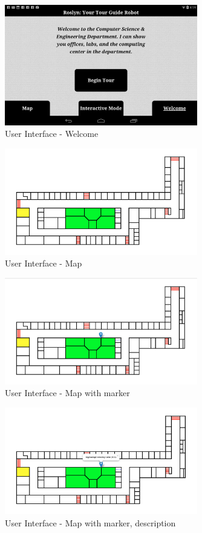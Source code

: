 \documentclass[11pt]{report}
\begin{document}
\begin{figure}[H]
 \centering
 \includegraphics[width=0.75\textwidth]{ui1.png}
 \caption{User Interface - Welcome}
 \label{fig:ui1}
\end{figure}
\begin{figure}[H]
 \centering
 \includegraphics[width=0.75\textwidth]{ui2.png}
 \caption{User Interface - Map}
 \label{fig:ui2}
\end{figure}
\begin{figure}[H]
 \centering
 \includegraphics[width=0.75\textwidth]{ui3.png}
 \caption{User Interface - Map with marker}
 \label{fig:ui3}
\end{figure}
\begin{figure}[H]
 \centering
 \includegraphics[width=0.75\textwidth]{ui4.png}
 \caption{User Interface - Map with marker, description}
 \label{fig:ui4}
\end{figure}
\end{document}
